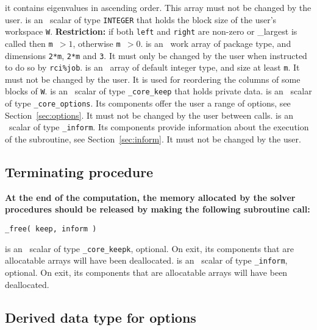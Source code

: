 \begin{description}
it contains eigenvalues in ascending order.
This array must not be changed by the user.
%
 is an \intentin\ scalar of type {\tt INTEGER} that
holds the block size of the user's workspace {\tt W}. 
{\bf Restriction:} %
if both {\tt left} and {\tt right} are non-zero
or \solver\_largest is called then {\tt m $>1$},
otherwise {\tt m $>0$}.
%
 is an \intentinout\
work array of package type,
and dimensions {\tt 2*m}, {\tt 2*m} and {\tt 3}.
It must only be changed by the user when
instructed to do so by 
{\tt rci\%job}.
%
 is an \intentinout\ 
array of default integer type, and size at least {\tt m}. 
It must not be changed by the user.
It is used for reordering the columns of some blocks of {\tt W}.
%
\itt{keep} is an \intentinout\ scalar of type 
{\tt \solver\_core\_keep} that holds private data. 
%
 is an \intentin\  scalar  of type {\tt \solver\_core\_options}.
Its components offer the user a range of options,
see Section~\ref{sec:options}.
It must not be changed by the user between calls.
%
 is an \intentinout\ scalar of type 
{\tt \solver\_inform}. Its components provide information about the execution
of the subroutine, see Section~\ref{sec:inform}.
It must not be changed by the user.
%
\end{description}

\subsection{Terminating procedure}

{\bf
At the end of the computation, the memory 
allocated by the solver procedures
should be released
by making the following subroutine call:
}

\medskip

\hspace{8mm} {\tt \solver\_free( keep, inform )}

\begin{description}
%
 is an \intentinout\ scalar of type 
{\tt \solver\_core\_keepk}, optional. 
On exit, its components that are allocatable arrays will have been deallocated. 
%
\itt{inform} is an \intentinout\ scalar of type {\tt \solver\_inform}, 
optional.
On exit, its components that are allocatable arrays will have been deallocated. 
%
\end{description}

\subsection{Derived data type for options}

